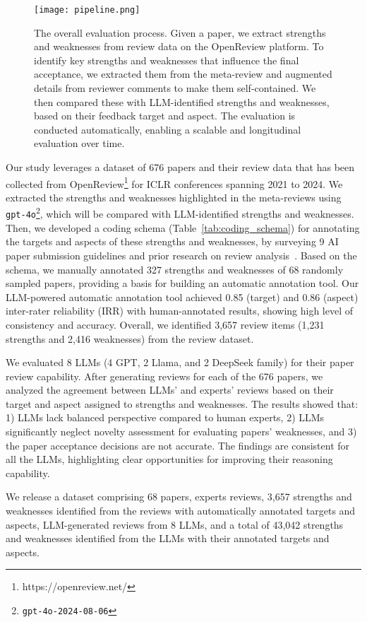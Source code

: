 \begin{figure*}[t]
    \centering
    \texttt{[image: pipeline.png]}
    \caption{The overall evaluation process. Given a paper, we extract strengths and weaknesses from review data on the OpenReview platform. To identify key strengths and weaknesses that influence the final acceptance, we extracted them from the meta-review and augmented details from reviewer comments to make them self-contained. We then compared these with LLM-identified strengths and weaknesses, based on their feedback target and aspect. The evaluation is conducted automatically, enabling a scalable 
 and longitudinal evaluation over time.}
    \label{fig:review_generation}
\end{figure*}



Our study leverages a dataset of 676 papers and their review data that has been collected from OpenReview\footnote{https://openreview.net/} for ICLR conferences spanning 2021 to 2024. We extracted the strengths and weaknesses highlighted in the meta-reviews using \texttt{gpt-4o\footnote{gpt-4o-2024-08-06}}, which will be compared with LLM-identified strengths and weaknesses. Then, we developed a coding schema (Table~\ref{tab:coding_schema}) for annotating the targets and aspects of these strengths and weaknesses, by surveying 9 AI paper submission guidelines and prior research on review analysis~\citep{chakraborty2020aspect, ghosal2022peer, yuan2022can}. Based on the schema, we manually annotated 327 strengths and weaknesses of 68 randomly sampled papers, providing a basis for building an automatic annotation tool. Our LLM-powered automatic annotation tool achieved 0.85 (target) and 0.86 (aspect) inter-rater reliability (IRR) with human-annotated results, showing high level of consistency and accuracy. Overall, we identified 3,657 review items (1,231 strengths and 2,416 weaknesses) from the review dataset.

We evaluated 8 LLMs (4 GPT, 2 Llama, and 2 DeepSeek family) for their paper review capability. After generating reviews for each of the 676 papers, we analyzed the agreement between LLMs' and experts' reviews based on their target and aspect assigned to strengths and weaknesses. The results showed that: 1) LLMs lack balanced perspective compared to human experts, 2) LLMs significantly neglect novelty assessment for evaluating papers' weaknesses, and 3) the paper acceptance decisions are not accurate. The findings are consistent for all the LLMs, highlighting clear opportunities for improving their reasoning capability.

We release a dataset comprising 68 papers, experts reviews, 3,657 strengths and weaknesses identified from the reviews with automatically annotated targets and aspects, LLM-generated reviews from 8 LLMs, and a total of 43,042 strengths and weaknesses identified from the LLMs with their annotated targets and aspects.
